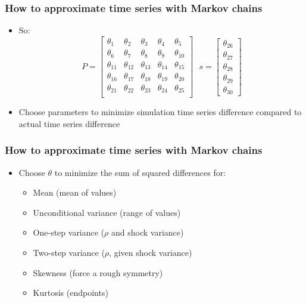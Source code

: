 \documentclass{beamer}
\begin{document}
\begin{frame}
\frametitle[alignment=center]{How to approximate time series with Markov chains}
\begin{itemize}
\item So:
$$P=\left[\begin{array}{ccccc}\theta_1 & \theta_2 & \theta_3 & \theta_4 & \theta_5 \\
					      \theta_6 & \theta_7 & \theta_8 & \theta_9 & \theta_{10} \\
					      \theta_{11} & \theta_{12} & \theta_{13} & \theta_{14} & \theta_{15} \\
					      \theta_{16} & \theta_{17} & \theta_{18} & \theta_{19} & \theta_{20} \\
					      \theta_{21} & \theta_{22} & \theta_{23} & \theta_{24} & \theta_{25} \\
					      \end{array}\right]\ \ \ s=\left[\begin{array}{c}\theta_26 \\ \theta_{27} \\ \theta_{28} \\ \theta_{29} \\ \theta_{30}\end{array}\right]$$
\item Choose parameters to minimize simulation time series difference compared to actual time series difference \end{itemize}
\end{frame}

\begin{frame}
\frametitle[alignment=center]{How to approximate time series with Markov chains}
\begin{itemize}
\item Choose $\theta$ to minimize the sum of squared differences for:
\begin{itemize}
\item Mean (mean of values)
\item Unconditional variance (range of values)
\item One-step variance ($\rho$ and shock variance)
\item Two-step variance ($\rho$, given shock variance)
\item Skewness (force a rough symmetry)
\item Kurtosis (endpoints)
\end{itemize}
\end{itemize}
\end{frame}
\end{document}
